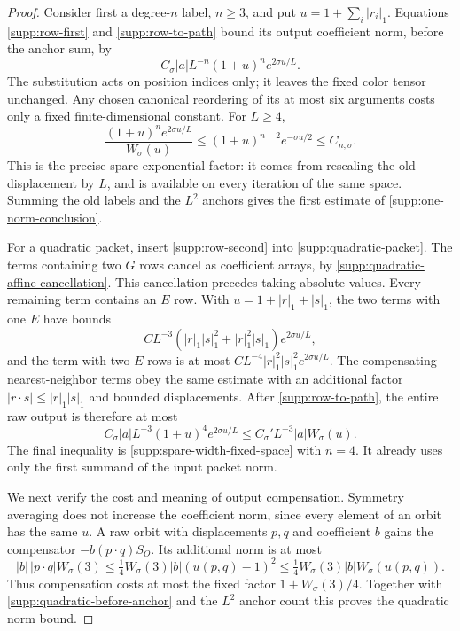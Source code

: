 \begin{proof}
Consider first a degree-$n$ label, $n\ge3$, and put
$u=1+\sum_i|r_i|_1$.  Equations \eqref{supp:row-first} and
\eqref{supp:row-to-path} bound its output coefficient norm, before the
anchor sum, by
\begin{equation}
 C_\sigma |a| L^{-n}(1+u)^n e^{2\sigma u/L}.
 \label{supp:degree-n-before-anchor}
\end{equation}
The substitution acts on position indices only; it leaves the fixed
color tensor unchanged.  Any chosen canonical reordering of its at
most six arguments costs only a fixed finite-dimensional constant.
For $L\ge4$,
\begin{equation}
 \frac{(1+u)^n e^{2\sigma u/L}}{W_\sigma(u)}
       \le (1+u)^{n-2}e^{-\sigma u/2}\le C_{n,\sigma}.
 \label{supp:spare-width-fixed-space}
\end{equation}
This is the precise spare exponential factor: it comes from rescaling
the old displacement by $L$, and is available on every iteration of
the same space.  Summing the old labels and the $L^2$ anchors gives the
first estimate of \eqref{supp:one-norm-conclusion}.

For a quadratic packet, insert \eqref{supp:row-second} into
\eqref{supp:quadratic-packet}.  The terms containing two $G$ rows cancel
as coefficient arrays, by \eqref{supp:quadratic-affine-cancellation}.
This cancellation precedes taking absolute values.  Every remaining
term contains an $E$ row.  With $u=1+|r|_1+|s|_1$, the two terms with
one $E$ have bounds
\[
 C L^{-3}(|r|_1|s|_1^2+|r|_1^2|s|_1)e^{2\sigma u/L},
\]
and the term with two $E$ rows is at most
$C L^{-4}|r|_1^2|s|_1^2e^{2\sigma u/L}$.
The compensating nearest-neighbor terms obey the same estimate with
an additional factor $|r\cdot s|\le |r|_1|s|_1$ and bounded displacements.
After \eqref{supp:row-to-path}, the entire raw output is therefore at most
\begin{equation}
 C_\sigma |a|L^{-3}(1+u)^4e^{2\sigma u/L}
       \le C_\sigma' L^{-3}|a|W_\sigma(u).
 \label{supp:quadratic-before-anchor}
\end{equation}
The final inequality is \eqref{supp:spare-width-fixed-space} with
$n=4$.  It already uses only the first summand of the input packet norm.

We next verify the cost and meaning of output compensation.  Symmetry
averaging does not increase the coefficient norm, since every element
of an orbit has the same $u$.  A raw orbit with displacements $p,q$
and coefficient $b$ gains the compensator $-b(p\cdot q)S_O$.  Its
additional norm is at most
\begin{equation}
 |b|\,|p\cdot q|W_\sigma(3)
 \le \tfrac14 W_\sigma(3)|b|(u(p,q)-1)^2
 \le \tfrac14 W_\sigma(3)|b|W_\sigma(u(p,q)).
 \label{supp:output-comp-cost}
\end{equation}
Thus compensation costs at most the fixed factor
$1+W_\sigma(3)/4$.  Together with
\eqref{supp:quadratic-before-anchor} and the $L^2$ anchor count this
proves the quadratic norm bound.


\end{proof}
